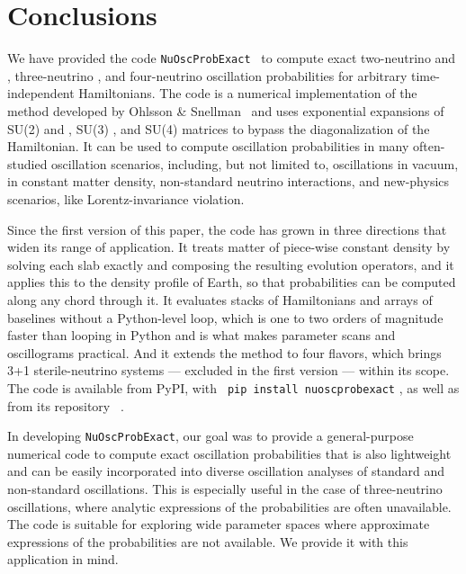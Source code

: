 \documentclass[final,5p,times,twocolumn]{elsarticle}
\providecommand{\DIFaddtex}[1]{{\protect\color{blue} \sf #1}} %
\providecommand{\DIFdeltex}[1]{{\protect\color{red} \scriptsize #1}} %
\providecommand{\DIFaddbegin}{} %
\providecommand{\DIFaddend}{} %
\providecommand{\DIFdelbegin}{} %
\providecommand{\DIFdelend}{} %
\providecommand{\DIFadd}[1]{\DIFaddtex{#1}} %
\providecommand{\DIFdel}[1]{\DIFdeltex{#1}} %
\begin{document}




\DIFaddend \section{Conclusions}
\label{section:conclusions}

We have provided the code {\tt NuOscProbExact}\ \cite{NuOscProbExact} to compute exact two-neutrino\DIFdelbegin \DIFdel{and }\DIFdelend \DIFaddbegin \DIFadd{, }\DIFaddend three-neutrino\DIFaddbegin \DIFadd{, and four-neutrino }\DIFaddend oscillation probabilities for arbitrary time-independent Hamiltonians.  The code is a numerical implementation of the method developed by Ohlsson \& Snellman\ \cite{Barger:1980tf, Ohlsson:1999xb, Ohlsson:1999um, Ohlsson:2000zz} and uses exponential expansions of SU(2)\DIFdelbegin \DIFdel{and }\DIFdelend \DIFaddbegin \DIFadd{, }\DIFaddend SU(3)\DIFaddbegin \DIFadd{, and SU(4) }\DIFaddend matrices to bypass the diagonalization of the Hamiltonian.  It can be used to compute oscillation probabilities in many often-studied oscillation scenarios, including, but not limited to, oscillations in vacuum, in constant matter density, non-standard neutrino interactions, and new-physics scenarios, like Lorentz-invariance violation.

\DIFaddbegin \DIFadd{Since the first version of this paper, the code has grown in three directions that widen its range of application.  It treats matter of piece-wise constant density by solving each slab exactly and composing the resulting evolution operators, and it applies this to the density profile of Earth, so that probabilities can be computed along any chord through it.  It evaluates stacks of Hamiltonians and arrays of baselines without a Python-level loop, which is one to two orders of magnitude faster than looping in Python and is what makes parameter scans and oscillograms practical.  And it extends the method to four flavors, which brings 3+1 sterile-neutrino systems --- excluded in the first version --- within its scope.  The code is available from PyPI, with }{\tt \DIFadd{pip install nuoscprobexact}}\DIFadd{, as well as from its repository\ }\cite{NuOscProbExact}\DIFadd{.
}

\DIFaddend In developing {\tt NuOscProbExact}, our goal was to provide a general-purpose numerical code to compute exact oscillation probabilities that is also lightweight and can be easily incorporated into diverse oscillation analyses of standard and non-standard oscillations.  This is especially useful in the case of three-neutrino oscillations, where analytic expressions of the probabilities are often unavailable.  The code is suitable for exploring wide parameter spaces where approximate expressions of the probabilities are not available.  We provide it with this application in mind.
\end{document}
